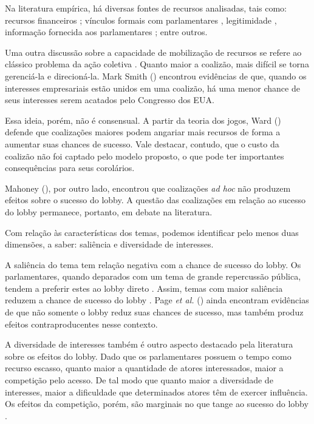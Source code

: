     Na literatura empírica, há diversas fontes de recursos analisadas, tais como: recursos financeiros \cite{dur2007question, eising2007institutional}; vínculos formais com parlamentares \cite{huwyler_no_2023}, legitimidade \cite{bunea2018legitimacy}, informação fornecida aos parlamentares \cite{kluver_informational_2012}; entre outros.

    Uma outra discussão sobre a capacidade de mobilização de recursos se refere ao clássico problema da ação coletiva \cite{olson1971logic}. Quanto maior a coalizão, mais difícil se torna gerenciá-la e direcioná-la. Mark Smith (\citeyear{smith2000merican}) encontrou evidências de que, quando os interesses empresariais estão unidos em uma coalizão, há uma menor chance de seus interesses serem acatados pelo Congresso dos EUA. 

    Essa ideia, porém, não é consensual. A partir da teoria dos jogos, Ward (\citeyear{ward_pressure_2004}) defende que coalizações maiores podem angariar mais recursos de forma a aumentar suas chances de sucesso. Vale destacar, contudo, que o custo da coalizão não foi captado pelo modelo proposto, o que pode ter importantes consequências para seus corolários.

    Mahoney (\citeyear{mahoney_lobbying_2007}), por outro lado, encontrou que coalizações \textit{ad hoc} não produzem efeitos sobre o sucesso do lobby. A questão das coalizações em relação ao sucesso do lobby permanece, portanto, em debate na literatura.

Com relação às características dos temas, podemos identificar pelo menos duas dimensões, a saber: saliência e diversidade de interesses.

    A saliência do tema tem relação negativa com a chance de sucesso do lobby. Os parlamentares, quando deparados com um tema de grande repercussão pública, tendem a preferir estes ao lobby direto \cite{kollman1998outside}. Assim, temas com maior saliência reduzem a chance de sucesso do lobby \cite{mahoney_lobbying_2007}. Page \textit{et al.} (\citeyear{page1987moves}) ainda encontram evidências de que não somente o lobby reduz suas chances de sucesso, mas também produz efeitos contraproducentes nesse contexto.

    A diversidade de interesses também é outro aspecto destacado pela literatura sobre os efeitos do lobby. Dado que os parlamentares possuem o tempo como recurso escasso, quanto maior a quantidade de atores interessados, maior a competição pelo acesso. De tal modo que quanto maior a diversidade de interesses, maior a dificuldade que determinados atores têm de exercer influência. Os efeitos da competição, porém, são marginais no que tange ao sucesso do lobby \cite{lowery_lobbying_2013}.

